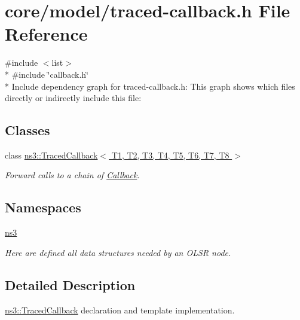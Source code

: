 \hypertarget{traced-callback_8h}{}\section{core/model/traced-\/callback.h File Reference}
\label{traced-callback_8h}
{\ttfamily \#include $<$list$>$}\\*
{\ttfamily \#include \char`\"{}callback.\+h\char`\"{}}\\*
Include dependency graph for traced-\/callback.h\+:
This graph shows which files directly or indirectly include this file\+:
\subsection*{Classes}
\begin{DoxyCompactItemize}
\item 
class \hyperlink{classns3_1_1TracedCallback}{ns3\+::\+Traced\+Callback$<$ T1, T2, T3, T4, T5, T6, T7, T8 $>$}
\begin{DoxyCompactList}\small\item\em Forward calls to a chain of \hyperlink{classns3_1_1Callback}{Callback}. \end{DoxyCompactList}\end{DoxyCompactItemize}
\subsection*{Namespaces}
\begin{DoxyCompactItemize}
\item 
 \hyperlink{namespacens3}{ns3}
\begin{DoxyCompactList}\small\item\em Here are defined all data structures needed by an O\+L\+SR node. \end{DoxyCompactList}\end{DoxyCompactItemize}


\subsection{Detailed Description}
\hyperlink{classns3_1_1TracedCallback}{ns3\+::\+Traced\+Callback} declaration and template implementation. 